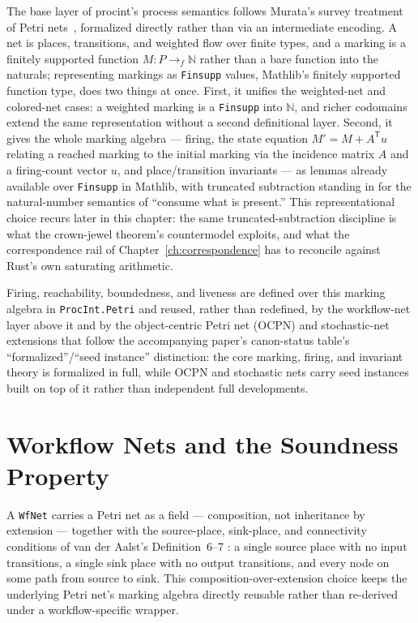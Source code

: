 The base layer of \textsf{procint}'s process semantics follows Murata's
survey treatment of Petri nets~\cite{murata1989}, formalized directly
rather than via an intermediate encoding. A net is places, transitions,
and weighted flow over finite types, and a marking is a finitely
supported function \(M : P \to_{f} \mathbb{N}\) rather than a bare
function into the naturals; representing markings as \texttt{Finsupp}
values, Mathlib's finitely supported function type, does two things at
once. First, it unifies the weighted-net and colored-net cases: a
weighted marking is a \texttt{Finsupp} into \(\mathbb{N}\), and richer
codomains extend the same representation without a second definitional
layer. Second, it gives the whole marking algebra --- firing, the state
equation \(M' = M + A^{\mathsf T}u\) relating a reached marking to the
initial marking via the incidence matrix \(A\) and a firing-count vector
\(u\), and place/transition invariants --- as lemmas already available
over \texttt{Finsupp} in Mathlib, with truncated subtraction standing in
for the natural-number semantics of ``consume what is present.'' This
representational choice recurs later in this chapter: the same
truncated-subtraction discipline is what the crown-jewel theorem's
countermodel exploits, and what the correspondence rail of
Chapter~\ref{ch:correspondence} has to reconcile against Rust's own
saturating arithmetic.

Firing, reachability, boundedness, and liveness are defined over this
marking algebra in \texttt{ProcInt.Petri} and reused, rather than
redefined, by the workflow-net layer above it and by the object-centric
Petri net (OCPN) and stochastic-net extensions that follow
the accompanying paper's canon-status table's ``formalized''/``seed
instance'' distinction: the
core marking, firing, and invariant theory is formalized in full, while
OCPN and stochastic nets carry seed instances built on top of it rather
than independent full developments.

\section{Workflow Nets and the Soundness Property}
\label{sec:procint-wfnet}

A \texttt{WfNet} carries a Petri net as a field --- composition, not
inheritance by extension --- together with the source-place, sink-place,
and connectivity conditions of van der Aalst's Definition~6--7
\cite{vanderaalst1997}: a single source place with no input transitions, a
single sink place with no output transitions, and every node on some path
from source to sink. This composition-over-extension choice keeps the
underlying Petri net's marking algebra directly reusable rather than
re-derived under a workflow-specific wrapper.

